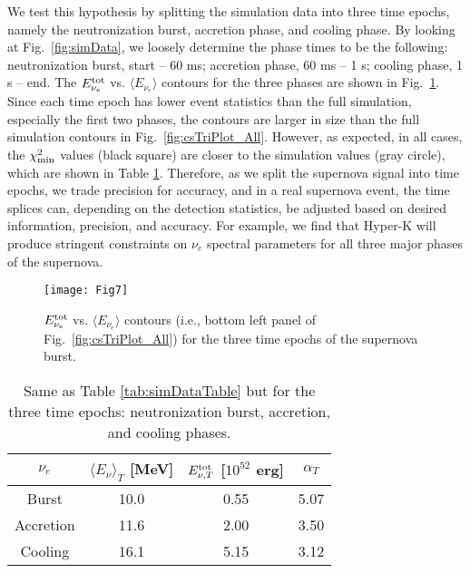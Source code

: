 \documentclass[aps,reprint,superscriptaddress]{revtex4-1}
\begin{document}
We test this hypothesis by splitting the simulation data into three time epochs, namely the neutronization burst, accretion phase, and cooling phase. By looking at Fig.~\ref{fig:simData}, we loosely determine the phase times to be the following: neutronization burst, start -- 60 ms; accretion phase, 60 ms -- 1 s; cooling phase, 1 s -- end. The $E_{\nu_e}^{\rm tot}$ vs. $\langle E_{\nu_e}\rangle$ contours for the three phases are shown in Fig.~\ref{fig:csPhasesEtotVsEavg}. Since each time epoch has lower event statistics than the full simulation, especially the first two phases, the contours are larger in size than the full simulation contours in Fig.~\ref{fig:csTriPlot_All}. However, as expected, in all cases, the $\chi_{\rm min}^{2}$ values (black square) are closer to the simulation values (gray circle), which are shown in Table \ref{tab:phasesData}. Therefore, as we split the supernova signal into time epochs, we trade precision for accuracy, and in a real supernova event, the time splices can, depending on the detection statistics, be adjusted based on desired information, precision, and accuracy. For example, we find that Hyper-K will produce stringent constraints on $\nu_e$ spectral parameters for all three major phases of the supernova.

\begin{figure}[t]
\centering
\texttt{[image: Fig7]}
\caption{$E_{\nu_e}^{\rm tot}$ vs. $\langle E_{\nu_e}\rangle$ contours (i.e., bottom left panel of Fig.~\ref{fig:csTriPlot_All}) for the three time epochs of the supernova burst.}
\label{fig:csPhasesEtotVsEavg}
\end{figure}

\begin{table}
\centering
\begin{tabular}{cccc}
\hline \hline $\nu_{e}$ & $\langle E_{\nu}\rangle_T$ [MeV] & $E_{\nu,T}^{\rm tot}$ [$10^{52}$ erg] & $\alpha_T$ \\
\hline Burst & 10.0 & 0.55 & 5.07 \\
Accretion & 11.6 & 2.00 & 3.50 \\
Cooling & 16.1 & 5.15 & 3.12 \\
\hline \hline
\end{tabular}
\caption{Same as Table \ref{tab:simDataTable} but for the three time epochs: neutronization burst, accretion, and cooling phases.}
\label{tab:phasesData}
\end{table}
\end{document}
